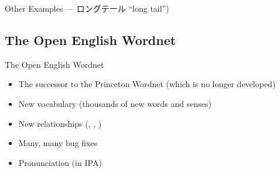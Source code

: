 \documentclass{beamer}
\begin{document}
\begin{frame}[allowframebreaks]{Other Examples --- ロングテール ``long tail'')}
\begin{exe}
\end{exe}

\end{frame}



    

\subsection{The Open English Wordnet}
  \begin{frame}{The Open English Wordnet}
      \begin{itemize}
      \item The successor to the Princeton Wordnet (which is no
        longer developed)
      \item New vocabulary (thousands of new words and senses)
      \item New relationships (, , )
      \item Many, many bug fixes
      \item Pronunciation (in IPA)
      \end{itemize}

  \end{frame}
\end{document}
